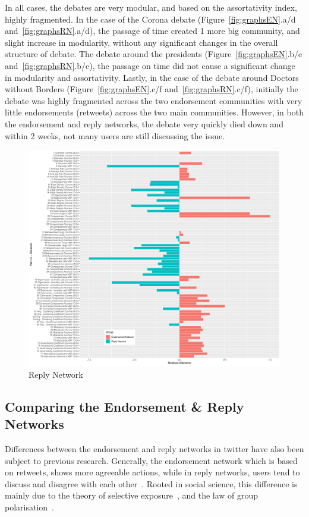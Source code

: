\documentclass[journal,11pt]{IEEEtran}
\begin{document}
In all cases, the debates are very modular, and based on the assortativity index, highly fragmented. In the case of the Corona debate (Figure~\ref{fig:graphsEN}.a/d and~\ref{fig:graphsRN}.a/d), the passage of time created 1 more big community, and slight increase in modularity, without any significant changes in the overall structure of debate. The debate around the presidents (Figure~\ref{fig:graphsEN}.b/e and~\ref{fig:graphsRN}.b/e), the passage on time did not cause a significant change in modularity and assortativity. Lastly, in the case of the debate around Doctors without Borders (Figure~\ref{fig:graphsEN}.c/f and~\ref{fig:graphsRN}.c/f), initially the debate was highly fragmented across the two endorsement communities with very little endorsements (retweets) across the two main communities. However, in both the endorsement and reply networks, the debate very quickly died down and within 2 weeks, not many users are still discussing the issue.
\begin{figure}[t]
\centering
\includegraphics[width =1\linewidth]{figures/twoSidedBarPlot.pdf}
\caption{Reply Network}
\label{fig:barplot}
\end{figure}
\subsection{Comparing the Endorsement \& Reply Networks}
\label{S:CER}
Differences between the endorsement and reply networks in twitter have also been subject to previous research. Generally, the endorsement network which is based on retweets, shows more agreeable actions, while in reply networks, users tend to discuss and disagree with each other~\cite{himelboim2013tweeting,colleoni2014echo}. Rooted in social science, this difference is mainly due to the theory of selective exposure~\cite{himelboim2013tweeting}, and the law of group polarisation~\cite{sunstein1999law}. \\
\end{document}
